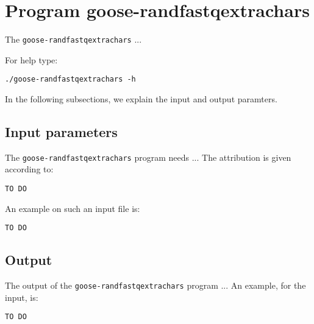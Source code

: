 \section{Program goose-randfastqextrachars}
The \texttt{goose-randfastqextrachars} ...

For help type:
\begin{lstlisting}
./goose-randfastqextrachars -h
\end{lstlisting}
In the following subsections, we explain the input and output paramters.

\subsection{Input parameters}

The \texttt{goose-randfastqextrachars} program needs ...
The attribution is given according to:
\begin{lstlisting}
TO DO
\end{lstlisting}

An example on such an input file is:
\begin{lstlisting}
TO DO
\end{lstlisting}

\subsection{Output}
The output of the \texttt{goose-randfastqextrachars} program ...
An example, for the input, is:
\begin{lstlisting}
TO DO
\end{lstlisting}
